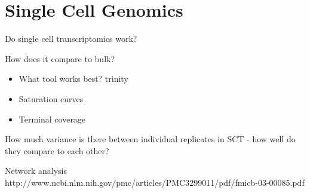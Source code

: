 \graphicspath{{chapters/5.Chapter_3/figures}}

\chapter{Single Cell Genomics}

Do single cell transcriptomics work?

How does it compare to bulk? 
\begin{itemize}
    \item What tool works best? trinity
    \item Saturation curves
    \item Terminal coverage
\end{itemize}

How much variance is there between individual replicates in SCT - how well do they compare to each other?



Network analysis
http://www.ncbi.nlm.nih.gov/pmc/articles/PMC3299011/pdf/fmicb-03-00085.pdf





